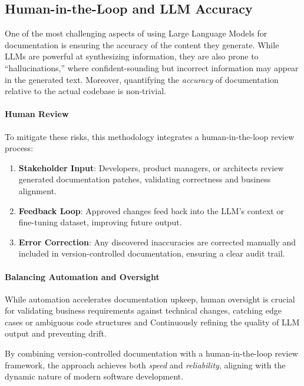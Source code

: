 \documentclass[12pt,oneside]{article}
\begin{document}
\subsection{Human-in-the-Loop and LLM Accuracy}
One of the most challenging aspects of using Large Language Models for documentation is ensuring 
the accuracy of the content they generate. While LLMs are powerful at synthesizing information, 
they are also prone to ``hallucinations,'' where confident-sounding but incorrect information may appear 
in the generated text. Moreover, quantifying the \emph{accuracy} of documentation relative to the actual 
codebase is non-trivial.

\paragraph{Human Review}
To mitigate these risks, this methodology integrates a human-in-the-loop review process:
\begin{enumerate}
  \item \textbf{Stakeholder Input}: Developers, product managers, or architects review generated documentation patches, validating correctness and business alignment.
  \item \textbf{Feedback Loop}: Approved changes feed back into the LLM’s context or fine-tuning dataset, improving future output.
  \item \textbf{Error Correction}: Any discovered inaccuracies are corrected manually and included in version-controlled documentation, ensuring a clear audit trail.
\end{enumerate}

\paragraph{Balancing Automation and Oversight}
While automation accelerates documentation upkeep, human oversight is crucial for validating business requirements 
against technical changes, catching edge cases or ambiguous code structures and Continuously refining the quality of 
LLM output and preventing drift.

By combining version-controlled documentation with a human-in-the-loop review framework, the approach achieves both \emph{speed} and \emph{reliability}, aligning with the dynamic nature of modern software development.



\end{document}
